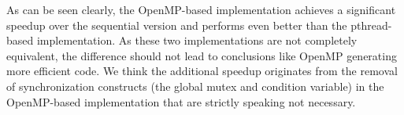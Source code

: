 \documentclass[]{article}
\begin{document}
As can be seen clearly, the OpenMP-based implementation achieves a significant speedup over the sequential version and performs even better than the pthread-based implementation. As these two implementations are not completely equivalent, the difference should not lead to conclusions like OpenMP generating more efficient code. We think the additional speedup originates from the removal of synchronization constructs (the global mutex and condition variable) in the OpenMP-based implementation that are strictly speaking not necessary.
\end{document}
